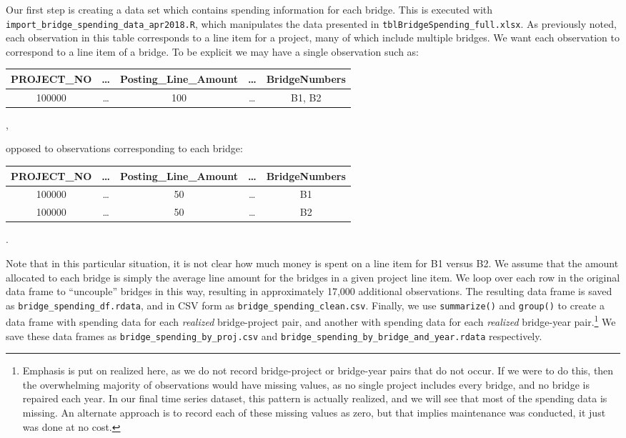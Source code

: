\documentclass{article}
\begin{document}
Our first step is creating a data set which contains spending information for each bridge. This is executed with \texttt{import\_bridge\_spending\_data\_apr2018.R}, which manipulates 
the data presented in \texttt{tblBridgeSpending\_full.xlsx}. As previously noted, each observation in this table corresponds to a line item for a project, many of which include multiple bridges. We want each observation to correspond to a line item of a bridge. To be explicit we may have a single observation such as: 
\begin{center}
\begin{tabular}{ccccc}
	PROJECT\_NO & \ldots &Posting\_Line\_Amount & \ldots & BridgeNumbers \\ \hline
	100000      & \ldots & 100               & \ldots     & B1, B2       
\end{tabular},
\end{center}
opposed to observations corresponding to each bridge: 
\begin{center}
	\begin{tabular}{ccccc}
		PROJECT\_NO & \ldots &Posting\_Line\_Amount & \ldots & BridgeNumbers \\ \hline
		100000      & \ldots & 50               & \ldots     & B1    \\   100000      & \ldots & 50               & \ldots     & B2
	\end{tabular}.
\end{center}
Note that in this particular situation, it is not clear how much money is spent on a line item for B1 versus B2. We assume that the amount allocated to each bridge is simply the average line amount for the bridges in a given project line item. We loop over each row in the original data frame to ``uncouple'' bridges in this way, resulting in approximately 17,000 additional observations. The resulting data frame is saved as \texttt{bridge\_spending\_df.rdata}, and in CSV form as \texttt{bridge\_spending\_clean.csv}. Finally, we use \texttt{summarize()} and \texttt{group()} to create a data frame with spending data for each \textit{realized} bridge-project pair, and another with spending data for each \textit{realized} bridge-year pair.\footnote{Emphasis is put on realized here, as we do not record bridge-project or bridge-year pairs that do not occur. If we were to do this, then the overwhelming majority of observations would have missing values, as no single project includes every bridge, and no bridge is repaired each year. In our final time series dataset, this pattern is actually realized, and we will see that most of the spending data is missing. An alternate approach is to record each of these missing values as zero, but that implies maintenance was conducted, it just was done at no cost.} We save these data frames as \texttt{bridge\_spending\_by\_proj.csv} and \texttt{bridge\_spending\_by\_bridge\_and\_year.rdata} respectively.
\end{document}
